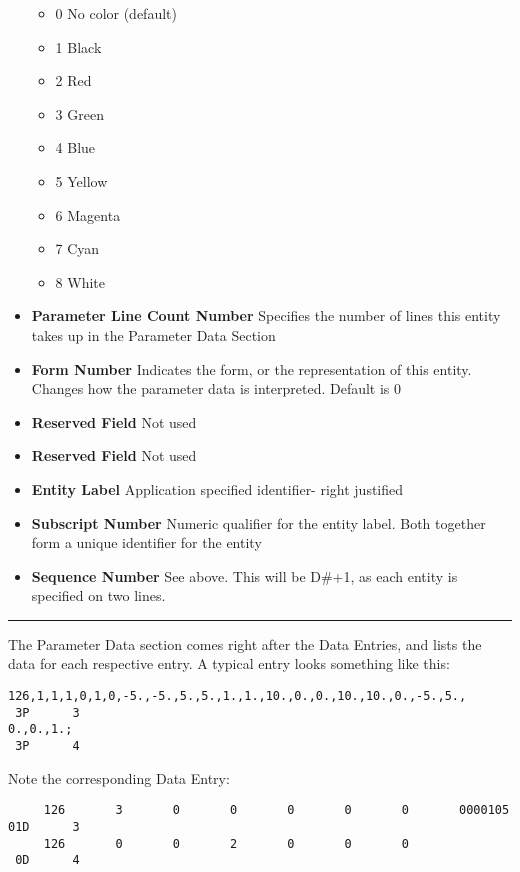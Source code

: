 \begin{itemize}
  \begin{itemize}
  \itemsep1pt\parskip0pt
  \item
    0 No color (default)
  \item
    1 Black
  \item
    2 Red
  \item
    3 Green
  \item
    4 Blue
  \item
    5 Yellow
  \item
    6 Magenta
  \item
    7 Cyan
  \item
    8 White
  \end{itemize}
\item
  \textbf{Parameter Line Count Number} Specifies the number of lines
  this entity takes up in the Parameter Data Section
\item
  \textbf{Form Number} Indicates the form, or the representation of this
  entity. Changes how the parameter data is interpreted. Default is 0
\item
  \textbf{Reserved Field} Not used
\item
  \textbf{Reserved Field} Not used
\item
  \textbf{Entity Label} Application specified identifier- right
  justified
\item
  \textbf{Subscript Number} Numeric qualifier for the entity label. Both
  together form a unique identifier for the entity
\item
  \textbf{Sequence Number} See above. This will be D\#+1, as each entity
  is specified on two lines.
\end{itemize}

\begin{center}\rule{0.5\linewidth}{\linethickness}\end{center}

The Parameter Data section comes right after the Data Entries, and lists
the data for each respective entry. A typical entry looks something like
this:

\texttt{126,1,1,1,0,1,0,-5.,-5.,5.,5.,1.,1.,10.,0.,0.,10.,10.,0.,-5.,5.,~~~~~~~3P~~~~~~3}\\\texttt{0.,0.,1.;~~~~~~~~~~~~~~~~~~~~~~~~~~~~~~~~~~~~~~~~~~~~~~~~~~~~~~~~~~~~~~3P~~~~~~4}

Note the corresponding Data Entry:

\texttt{~~~~~126~~~~~~~3~~~~~~~0~~~~~~~0~~~~~~~0~~~~~~~0~~~~~~~0~~~~~~~000010501D~~~~~~3}\\\texttt{~~~~~126~~~~~~~0~~~~~~~0~~~~~~~2~~~~~~~0~~~~~~~0~~~~~~~0~~~~~~~~~~~~~~~0D~~~~~~4}

